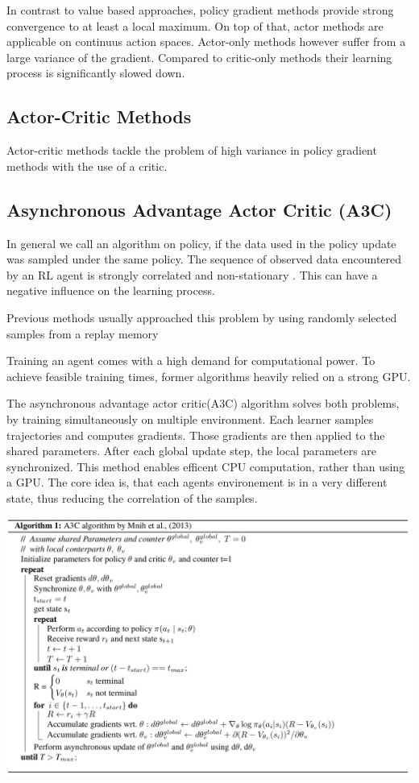 In contrast to value based approaches, policy gradient methods provide strong convergence to at least a local maximum.
On top of that, actor methods are applicable on continuus action spaces.
 \citep{Sutton00policygradient}
Actor-only methods however suffer from a large variance of the gradient. Compared to critic-only methods their learning process is significantly slowed down. \citep{Grondman12}
 

\subsection{Actor-Critic Methods}

Actor-critic methods tackle the problem of high variance in policy gradient methods with the use of a critic. 
\pagebreak

\subsection{Asynchronous Advantage Actor Critic (A3C)}

In general we call an algorithm on policy, if the data used in the policy update was sampled under the same policy. The sequence of observed data encountered by an RL agent is strongly correlated and non-stationary \citep{A3C}. This can have a negative influence on the learning process.

Previous methods usually approached this problem by using randomly selected samples from a replay memory \citep{mnih2015atari}

Training an agent comes with a high demand for computational power. To achieve feasible training times, former algorithms heavily relied on a strong GPU.

The asynchronous advantage actor critic(A3C) algorithm solves both problems, by training simultaneously on multiple environment.
Each learner samples trajectories and computes gradients. Those gradients are then applied to the shared parameters. 
After each global update step, the local parameters are synchronized.
This method enables efficent CPU computation, rather than using a GPU.
The core idea is, that each agents environement is in a very different state, thus reducing the correlation of the samples.
 
\includegraphics[scale=0.3]{bilder/aaac.png}
